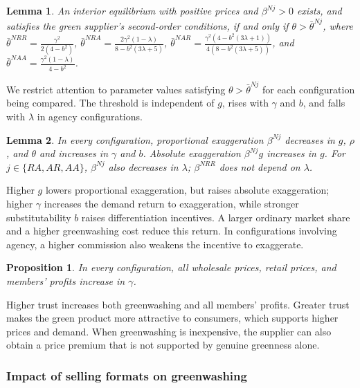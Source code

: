 \documentclass[preprint,review,12pt,authoryear,nopreprintline]{elsarticle}
\newtheorem{lemma}{Lemma}
\newtheorem{proposition}{Proposition}
\theoremstyle{definition}
\begin{document}
\begin{lemma}\label{lem:interior}
An interior equilibrium with positive prices and $\beta^{Nj}>0$ exists, and satisfies the green supplier's second-order conditions, if and only if $\theta>\bar{\theta}^{Nj}$, where $\bar{\theta}^{NRR}=\frac{\gamma ^2}{2(4-b^2)}$, $\bar{\theta}^{NRA}=\frac{2 \gamma ^2 (1-\lambda )}{8-b^2 (3 \lambda +5)}$, $\bar{\theta}^{NAR}=\frac{\gamma ^2 \left(4-b^2 (3 \lambda +1)\right)}{4 \left(8-b^2 (3 \lambda +5)\right)}$, and $\bar{\theta}^{NAA}=\frac{\gamma ^2 (1-\lambda )}{4-b^2}$.
\end{lemma}

We restrict attention to parameter values satisfying $\theta>\bar{\theta}^{Nj}$ for each configuration being compared. The threshold is independent of $g$, rises with $\gamma$ and $b$, and falls with $\lambda$ in agency configurations.

\begin{lemma}\label{lem:beta}
In every configuration, proportional exaggeration $\beta^{Nj}$ decreases in $g$, $\rho$, and $\theta$ and increases in $\gamma$ and $b$. Absolute exaggeration $\beta^{Nj}g$ increases in $g$. For $j\in\{RA,AR,AA\}$, $\beta^{Nj}$ also decreases in $\lambda$; $\beta^{NRR}$ does not depend on $\lambda$.
\end{lemma}

Higher $g$ lowers proportional exaggeration, but raises absolute exaggeration; higher $\gamma$ increases the demand return to exaggeration, while stronger substitutability $b$ raises differentiation incentives. A larger ordinary market share and a higher greenwashing cost reduce this return. In configurations involving agency, a higher commission also weakens the incentive to exaggerate.

\begin{proposition}\label{prop:trust}
In every configuration, all wholesale prices, retail prices, and members' profits increase in $\gamma$.
\end{proposition}

Higher trust increases both greenwashing and all members' profits. Greater trust makes the green product more attractive to consumers, which supports higher prices and demand. When greenwashing is inexpensive, the supplier can also obtain a price premium that is not supported by genuine greenness alone.

\subsubsection{Impact of selling formats on greenwashing}
\end{document}
